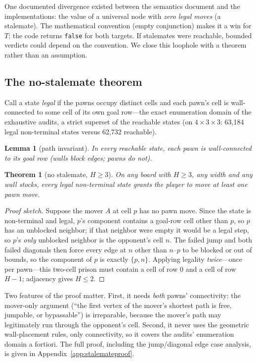 \documentclass[conference]{IEEEtran}
\newtheorem{theorem}{Theorem}
\newtheorem{lemma}{Lemma}
\newcommand{\varSpec}[3]{$#1{\times}#2{\times}#3$}
\begin{document}
One documented divergence existed between the semantics document and the implementations: the value of a universal node with \emph{zero legal moves} (a stalemate). The mathematical convention (empty conjunction) makes it a win for $T$; the code returns \texttt{false} for both targets. If stalemates were reachable, bounded verdicts could depend on the convention. We close this loophole with a theorem rather than an assumption.

\subsection{The no-stalemate theorem}

Call a state \emph{legal} if the pawns occupy distinct cells and each pawn's cell is wall-connected to some cell of its own goal row---the exact enumeration domain of the exhaustive audits, a strict superset of the reachable states (on \varSpec{4}{3}{3}: 63{,}184 legal non-terminal states versus 62{,}732 reachable).

\begin{lemma}[path invariant]
In every reachable state, each pawn is wall-connected to its goal row (walls block edges; pawns do not).
\end{lemma}

\begin{theorem}[no stalemate, $H\geq 3$]
\label{thm:stalemate}
On any board with $H\geq 3$, any width and any wall stocks, every legal non-terminal state grants the player to move at least one pawn move.
\end{theorem}

\begin{proof}[Proof sketch]
Suppose the mover $A$ at cell $p$ has no pawn move. Since the state is non-terminal and legal, $p$'s component contains a goal-row cell other than $p$, so $p$ has an unblocked neighbor; if that neighbor were empty it would be a legal step, so $p$'s \emph{only} unblocked neighbor is the opponent's cell $n$. The failed jump and both failed diagonals then force every edge at $n$ other than $n$--$p$ to be blocked or out of bounds, so the component of $p$ is exactly $\{p,n\}$. Applying legality \emph{twice}---once per pawn---this two-cell prison must contain a cell of row $0$ and a cell of row $H-1$; adjacency gives $H\leq 2$. \qedhere
\end{proof}

Two features of the proof matter. First, it needs \emph{both} pawns' connectivity: the mover-only argument (``the first vertex of the mover's shortest path is free, jumpable, or bypassable'') is irreparable, because the mover's path may legitimately run through the opponent's cell. Second, it never uses the geometric wall-placement rules, only connectivity, so it covers the audits' enumeration domain a fortiori. The full proof, including the jump/diagonal edge case analysis, is given in Appendix~\ref{app:stalemateproof}.
\end{document}
